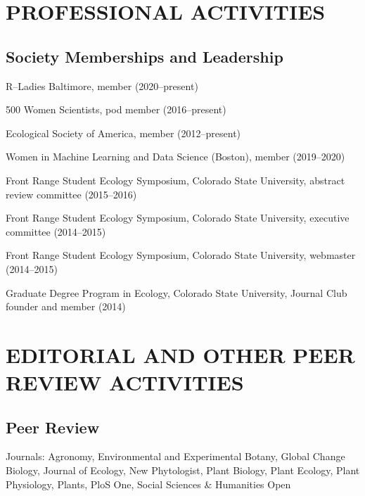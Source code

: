 \documentclass{cv}
\begin{document}
\section*{PROFESSIONAL ACTIVITIES}

\subsection*{Society Memberships and Leadership}

R--Ladies Baltimore, member (2020--present)

500 Women Scientists, pod member (2016--present)

Ecological Society of America, member (2012--present)

Women in Machine Learning and Data Science (Boston), member (2019--2020)

Front Range Student Ecology Symposium, Colorado State University, abstract review committee (2015--2016)

Front Range Student Ecology Symposium, Colorado State University, executive committee (2014--2015)

Front Range Student Ecology Symposium, Colorado State University, webmaster (2014--2015)

Graduate Degree Program in Ecology, Colorado State University, Journal Club founder and member (2014)


\section*{EDITORIAL AND OTHER PEER REVIEW ACTIVITIES}

\subsection*{Peer Review}

Journals: Agronomy, Environmental and Experimental Botany, Global Change Biology, Journal of Ecology, New Phytologist, Plant Biology, Plant Ecology, Plant Physiology, Plants, PloS One, Social Sciences \& Humanities Open

\end{document}
